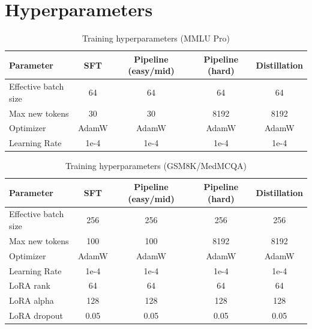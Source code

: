 \section{Hyperparameters}
\label{sec:hyperparameters}

\begin{table}[ht]
\centering
\begin{tabular}{l c c c c}
\hline
Parameter & SFT & Pipeline (easy/mid) & Pipeline (hard) & Distillation \\
\hline
Effective batch size & 64 & 64 & 64 & 64\\
Max new tokens & 30 & 30 & 8192 & 8192\\
Optimizer & AdamW & AdamW & AdamW & AdamW \\
Learning Rate & 1e-4 & 1e-4 & 1e-4 & 1e-4\\
\hline
\end{tabular}
\caption{Training hyperparameters (MMLU Pro)}
\label{tab:hypers_mmlu}
\end{table}

\begin{table}[ht]
\centering
\begin{tabular}{l c c c c}
\hline
Parameter & SFT & Pipeline (easy/mid) & Pipeline (hard) & Distillation \\
\hline
Effective batch size & 256 & 256 & 256 & 256\\
Max new tokens & 100 & 100 & 8192 & 8192\\
Optimizer & AdamW & AdamW & AdamW & AdamW \\
Learning Rate & 1e-4 & 1e-4 & 1e-4 & 1e-4\\
LoRA rank & 64 & 64 & 64 & 64\\
LoRA alpha & 128 & 128 & 128 & 128\\
LoRA dropout & 0.05 & 0.05 & 0.05 & 0.05\\
\hline
\end{tabular}
\caption{Training hyperparameters (GSM8K/MedMCQA)}
\label{tab:hypers_rest}
\end{table}